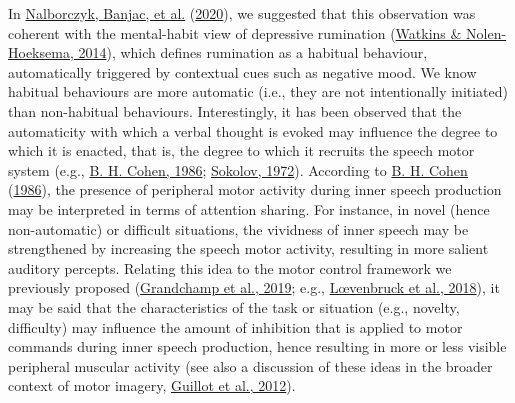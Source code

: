 \documentclass[
  english,
  man, donotrepeattitle,floatsintext]{apa6}
\begin{document}
In \protect\hyperlink{ref-nalborczyk_dissociating_2020}{Nalborczyk, Banjac, et al.} (\protect\hyperlink{ref-nalborczyk_dissociating_2020}{2020}), we suggested that this observation was coherent with the mental-habit view of depressive rumination (\protect\hyperlink{ref-watkins_habit-goal_2014}{Watkins \& Nolen-Hoeksema, 2014}), which defines rumination as a habitual behaviour, automatically triggered by contextual cues such as negative mood. We know habitual behaviours are more automatic (i.e., they are not intentionally initiated) than non-habitual behaviours. Interestingly, it has been observed that the automaticity with which a verbal thought is evoked may influence the degree to which it is enacted, that is, the degree to which it recruits the speech motor system (e.g., \protect\hyperlink{ref-cohen_motor_1986}{B. H. Cohen, 1986}; \protect\hyperlink{ref-sokolov_inner_1972}{Sokolov, 1972}). According to \protect\hyperlink{ref-cohen_motor_1986}{B. H. Cohen} (\protect\hyperlink{ref-cohen_motor_1986}{1986}), the presence of peripheral motor activity during inner speech production may be interpreted in terms of attention sharing. For instance, in novel (hence non-automatic) or difficult situations, the vividness of inner speech may be strengthened by increasing the speech motor activity, resulting in more salient auditory percepts. Relating this idea to the motor control framework we previously proposed (\protect\hyperlink{ref-grandchamp_condialint_2019}{Grandchamp et al., 2019}; e.g., \protect\hyperlink{ref-loevenbruck_cognitive_2018}{Lœvenbruck et al., 2018}), it may be said that the characteristics of the task or situation (e.g., novelty, difficulty) may influence the amount of inhibition that is applied to motor commands during inner speech production, hence resulting in more or less visible peripheral muscular activity (see also a discussion of these ideas in the broader context of motor imagery, \protect\hyperlink{ref-guillot_imagining_2012}{Guillot et al., 2012}).
\end{document}
